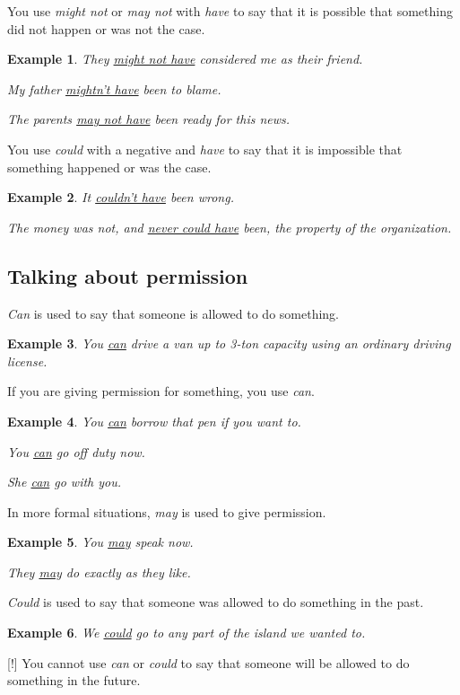 \documentclass[oneside]{book}
\numberwithin{equation}{section}
\newtheorem{example}{Example}[section]
\begin{document}
%
\noindent{} You use \textit{might not} or \textit{may not} with \textit{have} to say that it is possible that something did not happen or was not the case.
\begin{example}
    They \underline{might not have} considered me as their friend.
    
    My father \underline{mightn't have} been to blame.
    
    The parents \underline{may not have} been ready for this news.
\end{example}
%
\noindent{} You use \textit{could} with a negative and \textit{have} to say that it is impossible that something happened or was the case.
\begin{example}
    It \underline{couldn't have} been wrong.
    
    The money was not, and \underline{never could have} been, the property of the organization.
\end{example}

\subsection{Talking about permission}
\noindent{} \textit{Can} is used to say that someone is allowed to do something.
\begin{example}
    You \underline{can} drive a van up to 3-ton capacity using an ordinary driving license.
\end{example}
If you are giving permission for something, you use \textit{can}.
\begin{example}
    You \underline{can} borrow that pen if you want to.
    
    You \underline{can} go off duty now.
    
    She \underline{can} go with you.
\end{example}
%
\noindent{} In more formal situations, \textit{may} is used to give permission.
\begin{example}
    You \underline{may} speak now.
    
    They \underline{may} do exactly as they like.
\end{example}
%
\noindent{} \textit{Could} is used to say that someone was allowed to do something in the past.
\begin{example}
    We \underline{could} go to any part of the island we wanted to.
\end{example}
%
\noindent{} [!] You cannot use \textit{can} or \textit{could} to say that someone will be allowed to do something in the future.
\end{document}
